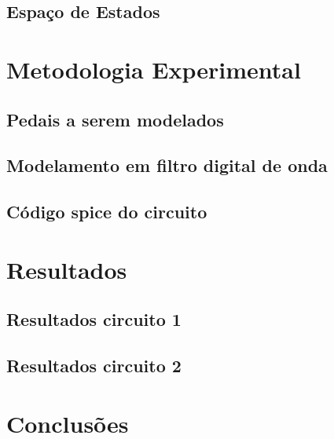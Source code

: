 	
	
	\section{Espaço de Estados}

	\chapter{Metodologia Experimental}
	
	\section{Pedais a serem modelados}
	
	\section{Modelamento em filtro digital de onda}
	
	\section{Código spice do circuito}

	\chapter{Resultados}
	
	\section{Resultados circuito 1}
	
	\section{Resultados circuito 2}
	

	\chapter{Conclusões}

